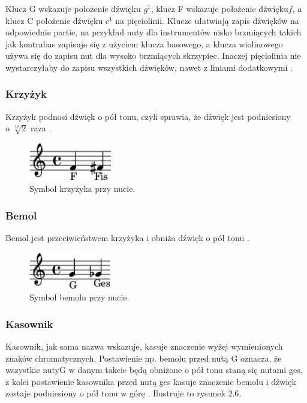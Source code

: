 \documentclass[printmode, eng, openany]{mgr}
\newcommand\tab[1][1cm]{\hspace*{#1}}
\begin{document}
\tab Klucz G wskazuje położenie dźwięku $g^{1}$, klucz F wskazuje położenie dźwięku\linebreak$f$, a klucz C położenie dźwięku $c^{1}$ na pięciolinii. Klucze ułatwiają zapis dźwięków na odpowiednie partie, na przykład nuty dla instrumentów nisko brzmiących takich jak kontrabas zapisuje się z użyciem klucza basowego, a klucza wiolinowego używa się do zapisu nut dla wysoko brzmiących skrzypiec. Inaczej pięciolinia nie wystarczyłaby do zapisu wszystkich dźwięków, nawet z liniami dodatkowymi \cite{key}. 

\subsubsection{Krzyżyk}
\tab Krzyżyk podnosi dźwięk o pół tonu, czyli sprawia, że dźwięk jest podniesiony\\o $\sqrt[12]{2}$ raza \cite{slow}. 
\begin{figure}[!htb]
\centering
\includegraphics[width=3.6cm]{krzyzyk.png}
\caption{Symbol krzyżyka przy nucie.}
\end{figure}

\subsubsection{Bemol}
\tab Bemol jest przeciwieństwem krzyżyka i obniża dźwięk o pół tonu \cite{slow}. 
\begin{figure}[!htb]
\centering
\includegraphics[width=3.6cm]{bemol.png}
\caption{Symbol bemolu przy nucie.}
\end{figure}

\subsubsection{Kasownik}
\tab Kasownik, jak sama nazwa wskazuje, kasuje znaczenie wyżej wymienionych znaków chromatycznych. Postawienie np. bemolu przed nutą G oznacza, że wszystkie nuty\linebreak G w danym takcie będą obniżone o pół tonu staną się nutami ges, z kolei postawienie kasownika przed nutą ges kasuje znaczenie bemolu i dźwięk zostaje podniesiony o pół tonu w górę \cite{slow}.  Ilustruje to rysunek 2.6.
\end{document}

